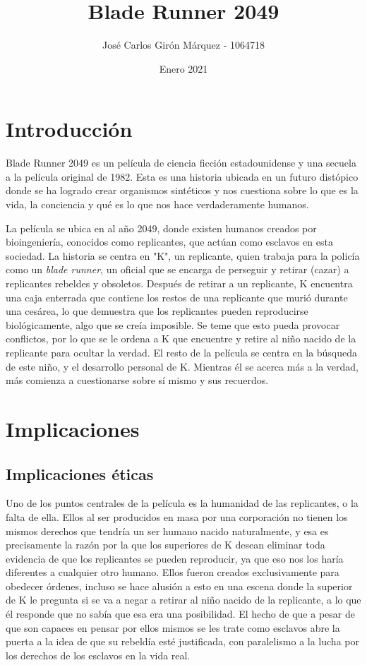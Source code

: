 \documentclass[]{scrreprt}
\begin{document}
\title{\textbf{Blade Runner 2049}}
\author{José Carlos Girón Márquez - 1064718}
\date{Enero 2021}
\maketitle

\section{Introducción}
Blade Runner 2049 es un película de ciencia ficción estadounidense y una secuela a la película original de 1982. Esta es una historia ubicada en un futuro distópico donde se ha logrado crear organismos sintéticos y nos cuestiona sobre lo que es la vida, la conciencia y qué es lo que nos hace verdaderamente humanos.

La película se ubica en al año 2049, donde existen humanos creados por bioingeniería, conocidos como replicantes, que actúan como esclavos en esta sociedad. La historia se centra en "K", un replicante, quien trabaja para la policía como un \textit{blade runner}, un oficial que se encarga de perseguir y retirar (cazar) a replicantes rebeldes y obsoletos. Después de retirar a un replicante, K encuentra una caja enterrada que contiene los restos de una replicante que murió durante una cesárea, lo que demuestra que los replicantes pueden reproducirse biológicamente, algo que se creía imposible. Se teme que esto pueda provocar conflictos, por lo que se le ordena a K que encuentre y retire al niño nacido de la replicante para ocultar la verdad. El resto de la película se centra en la búsqueda de este niño, y el desarrollo personal de K. Mientras él se acerca más a la verdad, más comienza a cuestionarse sobre sí mismo y sus recuerdos.

\section{Implicaciones}

\subsection{Implicaciones éticas}
Uno de los puntos centrales de la película es la humanidad de las replicantes, o la falta de ella. Ellos al ser producidos en masa por una corporación no tienen los mismos derechos que tendría un ser humano nacido naturalmente, y esa es precisamente la razón por la que los superiores de K desean eliminar toda evidencia de que los replicantes se pueden reproducir, ya que eso nos los haría diferentes a cualquier otro humano. Ellos fueron creados exclusivamente para obedecer órdenes, incluso se hace alusión a esto en una escena donde la superior de K le pregunta si se va a negar a retirar al niño nacido de la replicante, a lo que él responde que no sabía que esa era una posibilidad. El hecho de que a pesar de que son capaces en pensar por ellos mismos se les trate como esclavos abre la puerta a la idea de que su rebeldía esté justificada, con paralelismo a la lucha por los derechos de los esclavos en la vida real.
\end{document}
